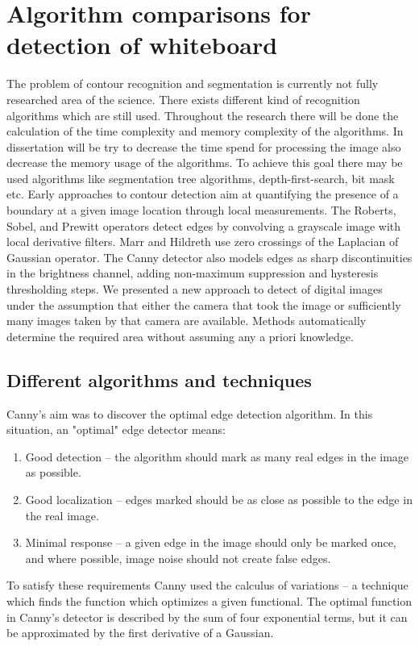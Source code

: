 \chapter{Algorithm comparisons for detection of whiteboard}

The problem of contour recognition and segmentation is currently not fully researched area of the science. There exists different kind of recognition algorithms which are still used. Throughout the research there will be done the calculation of the time complexity and memory complexity of the algorithms. In dissertation will be try to decrease the time spend for processing the image also decrease the memory usage of the algorithms. To achieve this goal there may be used algorithms like segmentation tree algorithms, depth-first-search, bit mask etc. Early approaches to contour detection aim at quantifying the presence of a boundary at a given image location through local measurements. The Roberts, Sobel, and Prewitt operators detect edges by convolving a grayscale image with local derivative filters.\cite{Argyle} Marr and Hildreth use zero crossings of the Laplacian of Gaussian operator. The Canny detector also models edges as sharp discontinuities in the brightness channel, adding non-maximum suppression and hysteresis thresholding steps.\cite{Pooja}
We presented a new approach to detect of digital images under the assumption that either the camera that took the image or sufficiently many images taken by that camera are available. Methods automatically determine the required area without assuming any a priori knowledge. 


\section{Different algorithms and techniques}
Canny's aim was to discover the optimal edge detection algorithm. In this situation, an "optimal" edge detector means:
\begin{enumerate}
\item Good detection – the algorithm should mark as many real edges in the image as possible.
\item Good localization – edges marked should be as close as possible to the edge in the real image.
\item Minimal response – a given edge in the image should only be marked once, and where possible, image noise should not create false edges. \cite{John}
\end{enumerate}

To satisfy these requirements Canny used the calculus of variations – a technique which finds the function which optimizes a given functional. The optimal function in Canny's detector is described by the sum of four exponential terms, but it can be approximated by the first derivative of a Gaussian.

